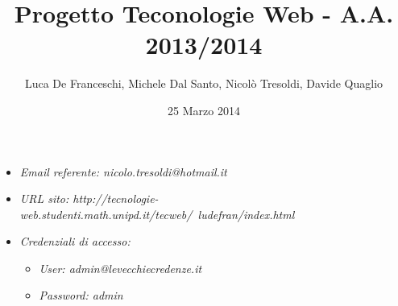 \documentclass[a4paper]{article}
\title{Progetto Teconologie Web - A.A. 2013/2014}
\author{Luca De Franceschi, Michele Dal Santo, Nicolò Tresoldi, Davide Quaglio}
\date{25 Marzo 2014}
\begin{document}
\maketitle

\begin{mdframed}
\begin{itemize}
\item \emph{ Email referente: nicolo.tresoldi@hotmail.it }
\item \emph{ URL sito: http://tecnologie-web.studenti.math.unipd.it/tecweb/~ludefran/index.html}
\item \emph{ Credenziali di accesso: }
\begin{itemize}
\item \emph{User:  admin@levecchiecredenze.it}
\item \emph{Password: admin}
\end{itemize}
\end{itemize}
\end{mdframed}









%
\end{document}
